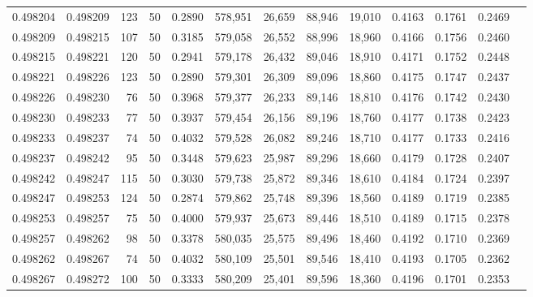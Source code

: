 \begin{tabular}{rrrrrrrrrrrrr}
0.498204 & 0.498209 &   123 &  50 &                                     0.2890 & 578,951 &  26,659 &  88,946 &  19,010 & 0.4163 & 0.1761 & 0.2469 \\
0.498209 & 0.498215 &   107 &  50 &                                     0.3185 & 579,058 &  26,552 &  88,996 &  18,960 & 0.4166 & 0.1756 & 0.2460 \\
0.498215 & 0.498221 &   120 &  50 &                                     0.2941 & 579,178 &  26,432 &  89,046 &  18,910 & 0.4171 & 0.1752 & 0.2448 \\
0.498221 & 0.498226 &   123 &  50 &                                     0.2890 & 579,301 &  26,309 &  89,096 &  18,860 & 0.4175 & 0.1747 & 0.2437 \\
0.498226 & 0.498230 &    76 &  50 &                                     0.3968 & 579,377 &  26,233 &  89,146 &  18,810 & 0.4176 & 0.1742 & 0.2430 \\
0.498230 & 0.498233 &    77 &  50 &                                     0.3937 & 579,454 &  26,156 &  89,196 &  18,760 & 0.4177 & 0.1738 & 0.2423 \\
0.498233 & 0.498237 &    74 &  50 &                                     0.4032 & 579,528 &  26,082 &  89,246 &  18,710 & 0.4177 & 0.1733 & 0.2416 \\
0.498237 & 0.498242 &    95 &  50 &                                     0.3448 & 579,623 &  25,987 &  89,296 &  18,660 & 0.4179 & 0.1728 & 0.2407 \\
0.498242 & 0.498247 &   115 &  50 &                                     0.3030 & 579,738 &  25,872 &  89,346 &  18,610 & 0.4184 & 0.1724 & 0.2397 \\
0.498247 & 0.498253 &   124 &  50 &                                     0.2874 & 579,862 &  25,748 &  89,396 &  18,560 & 0.4189 & 0.1719 & 0.2385 \\
0.498253 & 0.498257 &    75 &  50 &                                     0.4000 & 579,937 &  25,673 &  89,446 &  18,510 & 0.4189 & 0.1715 & 0.2378 \\
0.498257 & 0.498262 &    98 &  50 &                                     0.3378 & 580,035 &  25,575 &  89,496 &  18,460 & 0.4192 & 0.1710 & 0.2369 \\
0.498262 & 0.498267 &    74 &  50 &                                     0.4032 & 580,109 &  25,501 &  89,546 &  18,410 & 0.4193 & 0.1705 & 0.2362 \\
0.498267 & 0.498272 &   100 &  50 &                                     0.3333 & 580,209 &  25,401 &  89,596 &  18,360 & 0.4196 & 0.1701 & 0.2353 \\

\end{tabular}
